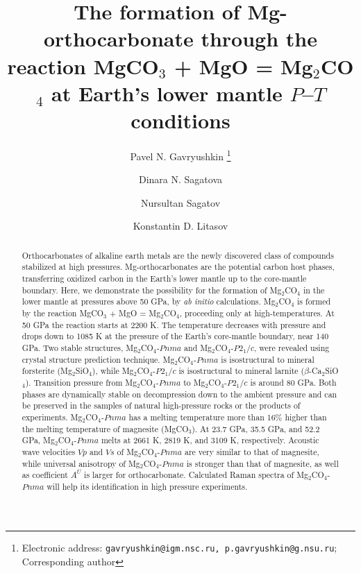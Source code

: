 \documentclass[a4paperm]{article}
\begin{document}

\title{The formation of Mg-orthocarbonate through the reaction MgCO$_3$ + MgO = Mg$_2$CO$_4$ at Earth's lower mantle $P$--$T$ conditions}


\author[1,2]{Pavel N. Gavryushkin
   \thanks{Electronic address: \texttt{gavryushkin@igm.nsc.ru, p.gavryushkin@g.nsu.ru}; Corresponding author}}     
\author[1,2]{Dinara N. Sagatova}
\author[1]{Nursultan Sagatov}
\author[3]{Konstantin D. Litasov}


\date{}
\maketitle


\begin{abstract}
Orthocarbonates of alkaline earth metals are the newly discovered class of compounds stabilized at high pressures.
Mg-orthocarbonates are the potential carbon host phases, transferring oxidized carbon in the Earth's lower mantle up to the core-mantle boundary.
Here, we demonstrate the possibility for the formation of Mg$_2$CO$_4$ in the lower mantle at pressures above 50 GPa, by {\it ab initio} calculations.
Mg$_2$CO$_4$ is formed by the reaction MgCO$_3$ + MgO = Mg$_2$CO$_4$, proceeding only at high-temperatures.
At 50 GPa the reaction starts at 2200 K.
The temperature decreases with pressure and drops down to 1085 K at the pressure of the Earth's core-mantle boundary, near 140 GPa.
Two stable structures, Mg$_2$CO$_4$-$Pnma$ and Mg$_2$CO$_4$-$P2_1/c$, were revealed using crystal structure prediction technique.
Mg$_2$CO$_4$-$Pnma$ is isostructural to mineral forsterite (Mg$_2$SiO$_4$), while Mg$_2$CO$_4$-$P2_1/c$ is isostructural to mineral larnite ($\beta$-Ca$_2$SiO$_4$).
Transition pressure from Mg$_2$CO$_4$-$Pnma$ to Mg$_2$CO$_4$-$P2_1/c$ is around 80 GPa.
Both phases are dynamically stable on decompression down to the ambient pressure and can be preserved in the samples of natural high-pressure rocks or the products of experiments.
Mg$_2$CO$_4$-$Pnma$ has a melting temperature more than 16\% higher  than the melting temperature of magnesite (MgCO$_3$).
At 23.7 GPa, 35.5 GPa, and 52.2 GPa, Mg$_2$CO$_4$-$Pnma$  melts at 2661 K, 2819 K, and 3109 K, respectively.
Acoustic wave velocities $Vp$ and $Vs$ of Mg$_2$CO$_4$-$Pnma$ are very similar to that of magnesite, while universal anisotropy of Mg$_2$CO$_4$-$Pnma$ is stronger than that of magnesite, as well as coefficient $A^U$ is larger for orthocarbonate.
Calculated Raman spectra of Mg$_2$CO$_4$-$Pnma$ will help its identification in high pressure experiments.



\end{abstract}
\end{document}
